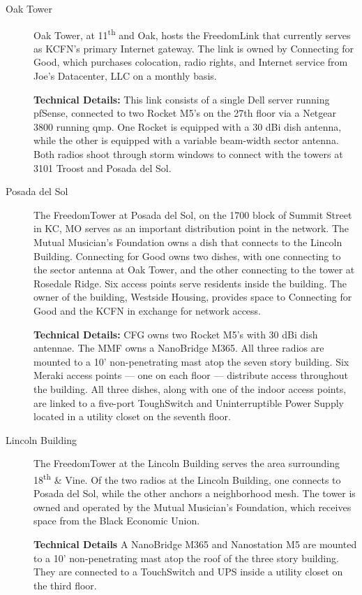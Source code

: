 \begin{description}
\item[Oak Tower]
Oak Tower, at 11\textsuperscript{th} and Oak, hosts the FreedomLink that currently serves as
KCFN's primary Internet gateway. The link is owned by Connecting
for Good, which purchases colocation, radio rights, and Internet service from
Joe's Datacenter, LLC on a monthly basis. \par
{\bf Technical Details:} This link consists of a single Dell server running
pfSense, connected to two Rocket M5's 
on the 27th floor via a Netgear 3800 running qmp. One Rocket is equipped with a
30 dBi dish antenna, while the other is equipped with a variable beam-width
sector antenna. Both radios shoot through storm 
windows to connect with the towers at 3101 Troost and Posada del Sol.

\item[Posada del Sol]
The FreedomTower at Posada del Sol, on the 1700 block of Summit Street in KC, MO
serves as an important distribution point in the network. The Mutual Musician's Foundation owns a dish that
connects to the Lincoln Building. Connecting for Good owns two dishes, with
one connecting to the sector antenna at Oak Tower, and the other connecting to the tower at
Rosedale Ridge. Six access points serve residents inside the building. The owner
of the building, Westside Housing, provides space to Connecting for Good and the
KCFN in exchange for network access. \par
{\bf Technical Details:} CFG owns two Rocket M5's with 30 dBi dish antennae. The
MMF owns a NanoBridge M365. All three radios are mounted to a 10'
non-penetrating mast atop the seven story building. Six Meraki access points ---
one on each floor --- distribute access throughout the building.  All three dishes, along with
one of the indoor access points, are linked to a five-port ToughSwitch and 
Uninterruptible Power Supply located in a utility closet on the seventh floor.

\item[Lincoln Building]
The FreedomTower at the Lincoln Building serves the area surrounding
18\textsuperscript{th}
\& Vine. Of the two radios at the Lincoln Building, one connects to Posada del
Sol, while the other anchors a neighborhood mesh. The tower is owned and operated by the Mutual Musician's Foundation, which
receives space from the Black Economic Union. \par
{\bf Technical Details} A NanoBridge M365 and Nanostation M5 are mounted to a 10' non-penetrating
mast atop the roof of the three story building. They are connected to a
TouchSwitch 
and UPS inside a utility closet on the third floor.


\end{description}
